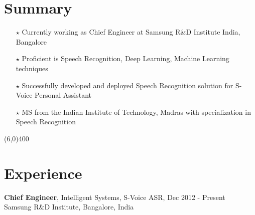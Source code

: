\documentclass[line,margin]{res}
\begin{document}
\begin{resume} 
\normalsize

\section{Summary}

\begin{itemize} \itemsep -1pt
 \item [$\star$] Currently working as Chief Engineer at Samsung R\&D Institute India, Bangalore
 \item [$\star$] Proficient is Speech Recognition, Deep Learning, Machine Learning techniques
 \item [$\star$] Successfully developed and deployed Speech Recognition solution for S-Voice Personal Assistant
 \item [$\star$] MS from the Indian Institute of Technology, Madras with specialization in Speech Recognition
\end{itemize}

\vspace{-5mm}
\line(6,0){400}


\section{Experience}

\normalsize
 {\bf Chief Engineer}, Intelligent Systems, S-Voice ASR, \hfill Dec 2012 - Present\\
 \hfill Samsung R\&D Institute, Bangalore, India
\small


\end{resume}
\end{document}
